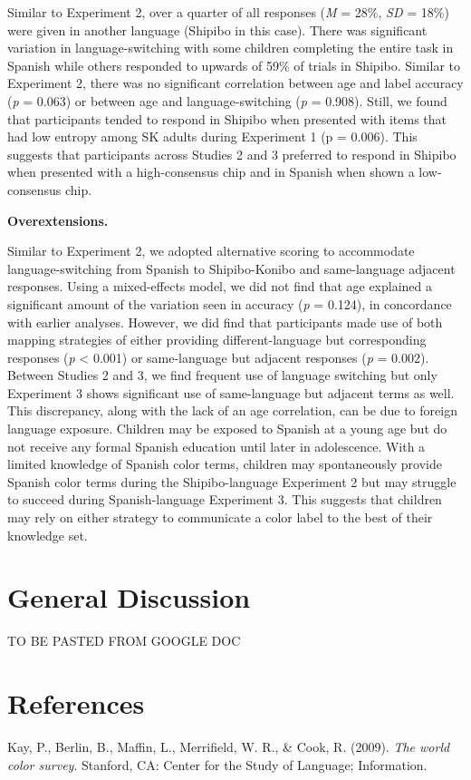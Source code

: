 \documentclass[floatsintext,man]{apa6}
\theoremstyle{definition}
\theoremstyle{definition}
\theoremstyle{definition}
\theoremstyle{remark}
\begin{document}
Similar to Experiment 2, over a quarter of all responses (\emph{M} =
28\%, \emph{SD} = 18\%) were given in another language (Shipibo in this
case). There was significant variation in language-switching with some
children completing the entire task in Spanish while others responded to
upwards of 59\% of trials in Shipibo. Similar to Experiment 2, there was
no significant correlation between age and label accuracy (\emph{p} =
0.063) or between age and language-switching (\emph{p} = 0.908). Still,
we found that participants tended to respond in Shipibo when presented
with items that had low entropy among SK adults during Experiment 1 (p =
0.006). This suggests that participants across Studies 2 and 3 preferred
to respond in Shipibo when presented with a high-consensus chip and in
Spanish when shown a low-consensus chip.

\textbf{Overextensions.}

Similar to Experiment 2, we adopted alternative scoring to accommodate
language-switching from Spanish to Shipibo-Konibo and same-language
adjacent responses. Using a mixed-effects model, we did not find that
age explained a significant amount of the variation seen in accuracy
(\emph{p} = 0.124), in concordance with earlier analyses. However, we
did find that participants made use of both mapping strategies of either
providing different-language but corresponding responses (\emph{p}
\textless{} 0.001) or same-language but adjacent responses (\emph{p} =
0.002). Between Studies 2 and 3, we find frequent use of language
switching but only Experiment 3 shows significant use of same-language
but adjacent terms as well. This discrepancy, along with the lack of an
age correlation, can be due to foreign language exposure. Children may
be exposed to Spanish at a young age but do not receive any formal
Spanish education until later in adolescence. With a limited knowledge
of Spanish color terms, children may spontaneously provide Spanish color
terms during the Shipibo-language Experiment 2 but may struggle to
succeed during Spanish-language Experiment 3. This suggests that
children may rely on either strategy to communicate a color label to the
best of their knowledge set.

\section{General Discussion}\label{general-discussion}

TO BE PASTED FROM GOOGLE DOC

\newpage

\section{References}\label{references}

\begingroup
\setlength{\parindent}{-0.5in} \setlength{\leftskip}{0.5in}

\hypertarget{refs}{}
\hypertarget{ref-berlin2009}{}
Kay, P., Berlin, B., Maffin, L., Merrifield, W. R., \& Cook, R. (2009).
\emph{The world color survey}. Stanford, CA: Center for the Study of
Language; Information.

\endgroup
\end{document}
